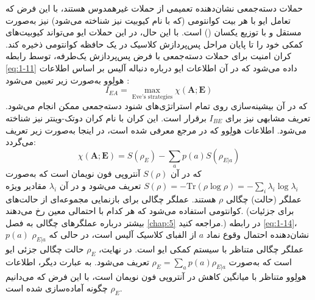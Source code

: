حملات دسته‌جمعی نشان‌دهنده تعمیمی از حملات غیرهمدوس هستند، با این فرض که تعامل ایو با هر بیت کوانتومی (که با نام کیوبیت نیز شناخته می‌شود) نیز به‌صورت مستقل و با توزیع یکسان () است. با این حال، در این حملات ایو می‌تواند کیوبیت‌های کمکی خود را تا پایان مراحل پس‌پردازش کلاسیک در یک حافظه کوانتومی ذخیره کند. کران امنیت برای حملات دسته‌جمعی با فرض پس‌پردازش یک‌طرفه، توسط رابطه \eqref{eq:1-11} داده می‌شود که در آن اطلاعات ایو درباره دنباله آلیس بر اساس اطلاعات هولِوو به‌صورت زیر تعیین می‌شود \cite{1-37, 1-38}:
\begin{equation}
	I_{EA} = \max_{\text{Eve's strategies}} \chi(\bm{A}; \bm{E})
	\label{eq:1-13}
\end{equation}
که در آن بیشینه‌سازی روی تمام استراتژی‌های شنود دسته‌جمعی ممکن انجام می‌شود. تعریف مشابهی نیز برای $I_{BE}$ برقرار است. این کران با نام کران دوتک-وینتر نیز شناخته می‌شود. اطلاعات هولِوو که در مرجع \cite{1-40} معرفی شده است، در اینجا به‌صورت زیر تعریف می‌گردد:
\begin{equation}
	\chi(\bm{A}; \bm{E}) = S(\rho_E) - \sum_{a} p(a) S(\rho_{E|a})
	\label{eq:1-14}
\end{equation}
که در آن $S(\rho)$ آنتروپی فون نویمان است که به‌صورت $S(\rho) = -\text{Tr}(\rho \log \rho) = -\sum_{i} \lambda_i \log \lambda_i$ تعریف می‌شود و در آن $\lambda_i$ مقادیر ویژه عملگر (حالت) چگالی $\rho$ هستند. عملگر چگالی برای بازنمایی مجموعه‌ای از حالت‌های کوانتومی استفاده می‌شود که هر کدام با احتمالی معین رخ می‌دهند. (برای جزئیات بیشتر درباره عملگرهای چگالی به فصل \ref{chap:5} مراجعه کنید.) در رابطه \eqref{eq:1-14}، $p(a)$ نشان‌دهنده احتمال وقوع نماد $a$ از الفبای کلاسیک آلیس است، در حالی که $\rho_{E|a}$ عملگر چگالی متناظر با سیستم کمکی ایو است. در نهایت، $\rho_E$ حالت چگالی جزئی ایو است که به‌صورت $\rho_E = \sum_{a} p(a) \rho_{E|a}$ تعریف می‌شود. به عبارت دیگر، اطلاعات هولِوو متناظر با میانگین کاهش در آنتروپی فون نویمان است، با این فرض که می‌دانیم $\rho_E$ چگونه آماده‌سازی شده است.

